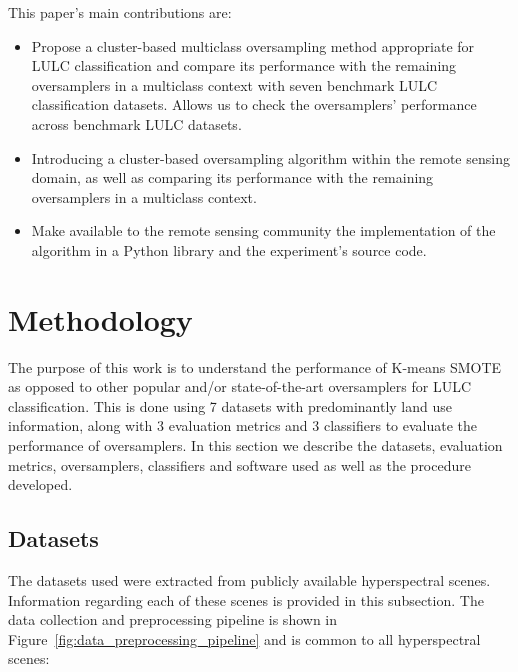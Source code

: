 \documentclass[preprint,12pt]{elsarticle}
\begin{document}
This paper's main contributions are:
\begin{itemize}
    \item Propose a cluster-based multiclass oversampling method appropriate
        for LULC classification and compare its performance with the remaining
        oversamplers in a multiclass context with seven benchmark LULC
        classification datasets. Allows us to check the oversamplers'
        performance across benchmark LULC datasets.
    \item Introducing a cluster-based oversampling algorithm within the remote
        sensing domain, as well as comparing its performance with the remaining
        oversamplers in a multiclass context.
    \item Make available to the remote sensing community the implementation
        of the algorithm in a Python library and the experiment's source code.
\end{itemize}

\section{Methodology}\label{sec:methodology}

The purpose of this work is to understand the performance of K-means SMOTE as
opposed to other popular and/or state-of-the-art oversamplers for LULC
classification. This is done using 7 datasets with predominantly land use
information, along with 3 evaluation metrics and 3 classifiers to evaluate the
performance of oversamplers. In this section we describe the datasets,
evaluation metrics, oversamplers, classifiers and software used as well as the
procedure developed.

\subsection{Datasets}

The datasets used were extracted from publicly available hyperspectral scenes.
Information regarding each of these scenes is provided in this subsection.
The data collection and preprocessing pipeline is shown in
Figure~\ref{fig:data_preprocessing_pipeline} and is common to all
hyperspectral scenes:
\end{document}
